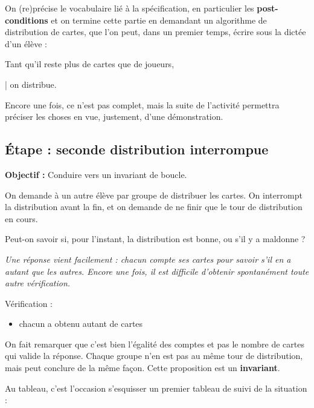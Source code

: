 On (re)précise le vocabulaire lié  à la spécification, en particulier les {\bfseries post-conditions} et on termine cette partie en demandant un algorithme de distribution de cartes, que l'on peut, dans un premier temps, écrire sous la dictée d'un élève :

\begin{exemple}[title = Au tableau]{}{}
Tant qu'il reste plus de cartes que de joueurs,

\quad | \quad    on distribue.
\end{exemple}

Encore une fois, ce n'est pas complet, mais la suite de l'activité permettra préciser les choses en vue, justement, d'une démonstration. 

\subsection{Étape  : seconde distribution interrompue}

{\bfseries Objectif :} Conduire vers un invariant de boucle.

\medskip

On demande à un autre élève par groupe de distribuer les cartes. On interrompt la distribution avant la fin, et on demande de ne finir que le tour de distribution en cours.

\begin{question}Peut-on savoir si, pour l'instant, la distribution est bonne, ou s'il y a maldonne ?
\end{question}

\textit{Une réponse vient facilement : chacun compte ses cartes pour savoir s'il en a autant que les autres. Encore une fois, il est difficile d'obtenir spontanément toute autre vérification.}


\begin{exemple}[title = Au tableau]{}{}
Vérification :
\begin{itemize}[leftmargin=*,label=$\star$]
    \item chacun a obtenu autant de cartes
\end{itemize} 
\end{exemple}

On fait remarquer que c'est bien l'égalité des comptes et pas le nombre de cartes qui valide la réponse. Chaque groupe n'en est pas au même tour de distribution, mais peut conclure de la même façon. Cette proposition est un {\bfseries invariant}.

Au tableau, c'est l'occasion s'esquisser un premier tableau de suivi de la situation :


